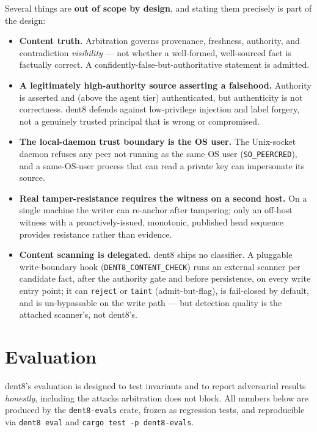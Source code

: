 \documentclass[11pt]{article}
\newcommand{\code}[1]{\texttt{#1}}
\begin{document}
Several things are \textbf{out of scope by design}, and stating them precisely is part of the design:

\begin{itemize}[leftmargin=*]
  \item \textbf{Content truth.} Arbitration governs provenance, freshness, authority, and contradiction \emph{visibility} --- not whether a well-formed, well-sourced fact is factually correct. A confidently-false-but-authoritative statement is admitted.
  \item \textbf{A legitimately high-authority source asserting a falsehood.} Authority is asserted and (above the agent tier) authenticated, but authenticity is not correctness. dent8 defends against low-privilege injection and label forgery, not a genuinely trusted principal that is wrong or compromised.
  \item \textbf{The local-daemon trust boundary is the OS user.} The Unix-socket daemon refuses any peer not running as the same OS user (\code{SO\_PEERCRED}), and a same-OS-user process that can read a private key can impersonate its source.
  \item \textbf{Real tamper-resistance requires the witness on a second host.} On a single machine the writer can re-anchor after tampering; only an off-host witness with a proactively-issued, monotonic, published head sequence provides resistance rather than evidence.
  \item \textbf{Content scanning is delegated.} dent8 ships no classifier. A pluggable write-boundary hook (\code{DENT8\_CONTENT\_CHECK}) runs an external scanner per candidate fact, after the authority gate and before persistence, on every write entry point; it can \code{reject} or \code{taint} (admit-but-flag), is fail-closed by default, and is un-bypassable on the write path --- but detection quality is the attached scanner's, not dent8's.
\end{itemize}

\section{Evaluation}

dent8's evaluation is designed to test invariants and to report adversarial results \emph{honestly}, including the attacks arbitration does not block. All numbers below are produced by the \code{dent8-evals} crate, frozen as regression tests, and reproducible via \code{dent8 eval} and \code{cargo test -p dent8-evals}.
\end{document}
